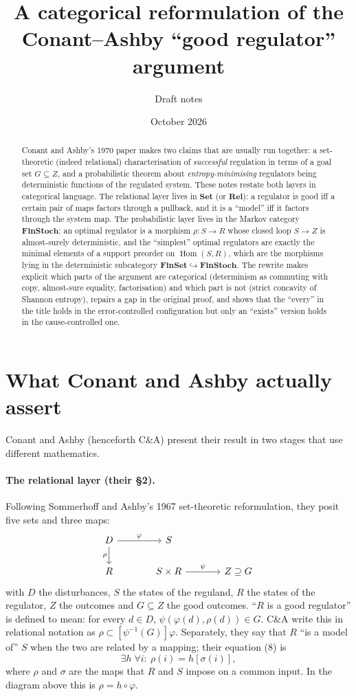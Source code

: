 \documentclass[11pt,a4paper]{article}
\title{A categorical reformulation of the\\Conant--Ashby ``good regulator'' argument}
\author{Draft notes}
\date{October 2026}
\theoremstyle{definition}
\theoremstyle{remark}
\newcommand{\Set}{\mathbf{Set}}
\newcommand{\FinSet}{\mathbf{FinSet}}
\newcommand{\Rel}{\mathbf{Rel}}
\newcommand{\FinStoch}{\mathbf{FinStoch}}
\newcommand{\Hom}{\operatorname{Hom}}
\begin{document}
\maketitle

\begin{abstract}
\noindent
Conant and Ashby's 1970 paper \cite{ConantAshby1970} makes two claims that are
usually run together: a set-theoretic (indeed relational) characterisation of
\emph{successful} regulation in terms of a goal set $G\subseteq Z$, and a
probabilistic theorem about \emph{entropy-minimising} regulators being
deterministic functions of the regulated system. These notes restate both layers
in categorical language. The relational layer lives in $\Set$ (or $\Rel$): a
regulator is good iff a certain pair of maps factors through a pullback, and it
is a ``model'' iff it factors through the system map. The probabilistic layer
lives in the Markov category $\FinStoch$: an optimal regulator is a morphism
$\rho\colon S\to R$ whose closed loop $S\to Z$ is almost-surely deterministic,
and the ``simplest'' optimal regulators are exactly the minimal elements of a
support preorder on $\Hom(S,R)$, which are the morphisms lying in the
deterministic subcategory $\FinSet\hookrightarrow\FinStoch$. The rewrite makes
explicit which parts of the argument are categorical (determinism as commuting
with copy, almost-sure equality, factorisation) and which part is not (strict
concavity of Shannon entropy), repairs a gap in the original proof, and shows
that the ``every'' in the title holds in the error-controlled configuration but
only an ``exists'' version holds in the cause-controlled one.
\end{abstract}

\section{What Conant and Ashby actually assert}

Conant and Ashby (henceforth C\&A) present their result in two stages that use
different mathematics.

\paragraph{The relational layer (their \S2).}
Following Sommerhoff and Ashby's 1967 set-theoretic reformulation, they posit
five sets and three maps:
\[
\begin{tikzcd}[column sep=large]
D \arrow[r,"\varphi"] \arrow[d,"\rho"'] & S \\
R & S\times R \arrow[r,"\psi"] & Z \supseteq G
\end{tikzcd}
\]
with $D$ the disturbances, $S$ the states of the reguland, $R$ the states of the regulator, $Z$ the outcomes and $G\subseteq Z$ the good outcomes.
``$R$ is a good regulator'' is defined to mean: for every $d\in D$,
$\psi(\varphi(d),\rho(d))\in G$. C\&A write this in relational notation as
$\rho\subset[\psi^{-1}(G)]\varphi$. Separately, they say that $R$ ``is a
model of'' $S$ when the two are related by a mapping; their equation (8) is
\[
\exists h\;\forall i:\ \rho(i)=h[\sigma(i)],
\]
where $\rho$ and $\sigma$ are the maps that $R$ and $S$ impose on a common input.
In the diagram above this is $\rho=h\circ\varphi$.
\end{document}
